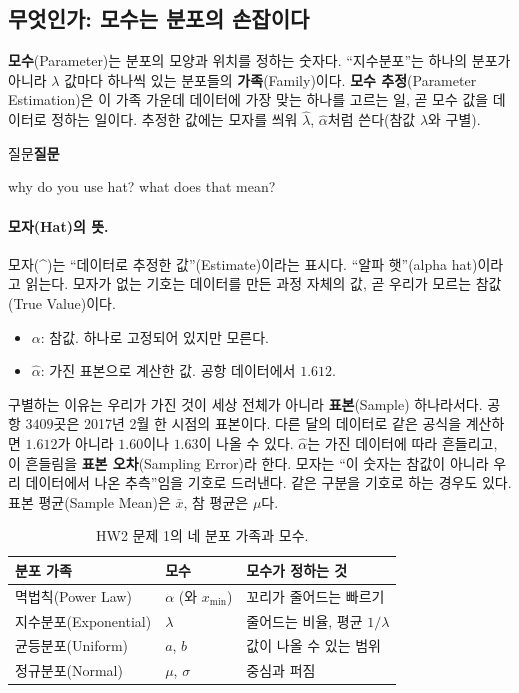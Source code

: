 \documentclass[11pt]{article}
\newenvironment{callout}[1][]
  {\par\medskip\noindent
   \begin{lrbox}{\calloutbox}\begin{minipage}{0.92\linewidth}
   \def\calloutttl{#1}\ifx\calloutttl\empty\else\textbf{#1}\par\smallskip\fi}
  {\end{minipage}\end{lrbox}%
   \fcolorbox{black!30}{black!3}{\usebox{\calloutbox}}\par\medskip}
\newcommand{\term}[1]{\textbf{#1}}
\begin{document}
\subsection{무엇인가: 모수는 분포의 손잡이다}
\term{모수}(Parameter)는 분포의 모양과 위치를 정하는 숫자다. ``지수분포''는 하나의
분포가 아니라 $\lambda$ 값마다 하나씩 있는 분포들의 \term{가족}(Family)이다.
\term{모수 추정}(Parameter Estimation)은 이 가족 가운데 데이터에 가장 맞는 하나를
고르는 일, 곧 모수 값을 데이터로 정하는 일이다. 추정한 값에는 모자를 씌워
$\hat\lambda$, $\hat\alpha$처럼 쓴다(참값 $\lambda$와 구별).

\begin{callout}[질문]
why do you use hat? what does that mean?
\end{callout}

\paragraph{모자(Hat)의 뜻.} 모자(\^{})는 ``데이터로 추정한 값''(Estimate)이라는 표시다.
``알파 햇''(alpha hat)이라고 읽는다. 모자가 없는 기호는 데이터를 만든 과정 자체의 값,
곧 우리가 모르는 참값(True Value)이다.
\begin{itemize}
  \item $\alpha$: 참값. 하나로 고정되어 있지만 모른다.
  \item $\hat\alpha$: 가진 표본으로 계산한 값. 공항 데이터에서 $1.612$.
\end{itemize}
구별하는 이유는 우리가 가진 것이 세상 전체가 아니라 \term{표본}(Sample) 하나라서다.
공항 $3409$곳은 2017년 2월 한 시점의 표본이다. 다른 달의 데이터로 같은 공식을 계산하면
$1.612$가 아니라 $1.60$이나 $1.63$이 나올 수 있다. $\hat\alpha$는 가진 데이터에 따라
흔들리고, 이 흔들림을 \term{표본 오차}(Sampling Error)라 한다. 모자는 ``이 숫자는 참값이
아니라 우리 데이터에서 나온 추측''임을 기호로 드러낸다. 같은 구분을 기호로 하는 경우도
있다. 표본 평균(Sample Mean)은 $\bar x$, 참 평균은 $\mu$다.

\begin{table}[H]
  \centering
  \caption{HW2 문제 1의 네 분포 가족과 모수.}
  \label{tab:param-families}
  \begin{tabular}{lll}
    \toprule
    분포 가족 & 모수 & 모수가 정하는 것 \\
    \midrule
    멱법칙(Power Law) & $\alpha$ (와 $x_{\min}$) & 꼬리가 줄어드는 빠르기 \\
    \midrule
    지수분포(Exponential) & $\lambda$ & 줄어드는 비율, 평균 $1/\lambda$ \\
    \midrule
    균등분포(Uniform) & $a$, $b$ & 값이 나올 수 있는 범위 \\
    \midrule
    정규분포(Normal) & $\mu$, $\sigma$ & 중심과 퍼짐 \\
    \bottomrule
  \end{tabular}
\end{table}
\end{document}

